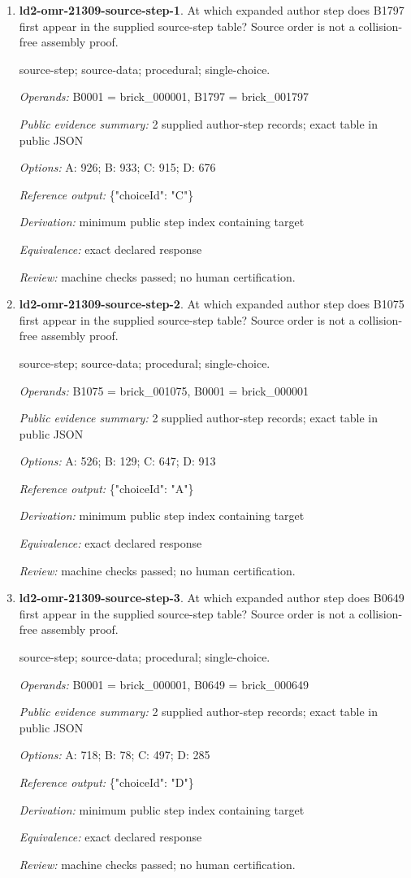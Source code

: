 \begin{enumerate}
\item \textbf{ld2-omr-21309-source-step-1}. At which expanded author step does B1797 first appear in the supplied source-step table? Source order is not a collision-free assembly proof.
\par{\small source-step; source-data; procedural; single-choice.\par\textit{Operands:} B0001 = brick\_000001, B1797 = brick\_001797\par\textit{Public evidence summary:} 2 supplied author-step records; exact table in public JSON\par\textit{Options:} A: 926; B: 933; C: 915; D: 676\par\textit{Reference output:} \{"choiceId": "C"\}\par\textit{Derivation:} minimum public step index containing target\par\textit{Equivalence:} exact declared response\par\textit{Review:} machine checks passed; no human certification.}
\item \textbf{ld2-omr-21309-source-step-2}. At which expanded author step does B1075 first appear in the supplied source-step table? Source order is not a collision-free assembly proof.
\par{\small source-step; source-data; procedural; single-choice.\par\textit{Operands:} B1075 = brick\_001075, B0001 = brick\_000001\par\textit{Public evidence summary:} 2 supplied author-step records; exact table in public JSON\par\textit{Options:} A: 526; B: 129; C: 647; D: 913\par\textit{Reference output:} \{"choiceId": "A"\}\par\textit{Derivation:} minimum public step index containing target\par\textit{Equivalence:} exact declared response\par\textit{Review:} machine checks passed; no human certification.}
\item \textbf{ld2-omr-21309-source-step-3}. At which expanded author step does B0649 first appear in the supplied source-step table? Source order is not a collision-free assembly proof.
\par{\small source-step; source-data; procedural; single-choice.\par\textit{Operands:} B0001 = brick\_000001, B0649 = brick\_000649\par\textit{Public evidence summary:} 2 supplied author-step records; exact table in public JSON\par\textit{Options:} A: 718; B: 78; C: 497; D: 285\par\textit{Reference output:} \{"choiceId": "D"\}\par\textit{Derivation:} minimum public step index containing target\par\textit{Equivalence:} exact declared response\par\textit{Review:} machine checks passed; no human certification.}

\end{enumerate}
